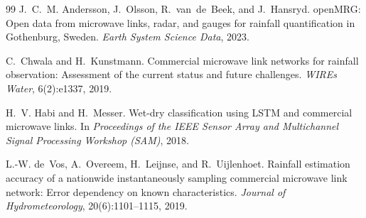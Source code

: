 \documentclass[12pt, a4paper]{article}
\begin{document}
\begin{thebibliography}{99}
J.~C.~M. Andersson, J.~Olsson, R.~van~de~Beek, and J.~Hansryd.
\newblock openMRG: Open data from microwave links, radar, and gauges for rainfall quantification in Gothenburg, Sweden.
\newblock \emph{Earth System Science Data}, 2023.

C.~Chwala and H.~Kunstmann.
\newblock Commercial microwave link networks for rainfall observation: Assessment of the current status and future challenges.
\newblock \emph{WIREs Water}, 6(2):e1337, 2019.

H.~V. Habi and H.~Messer.
\newblock Wet-dry classification using LSTM and commercial microwave links.
\newblock In \emph{Proceedings of the IEEE Sensor Array and Multichannel Signal Processing Workshop (SAM)}, 2018.

L.-W. de~Vos, A.~Overeem, H.~Leijnse, and R.~Uijlenhoet.
\newblock Rainfall estimation accuracy of a nationwide instantaneously sampling commercial microwave link network: Error dependency on known characteristics.
\newblock \emph{Journal of Hydrometeorology}, 20(6):1101--1115, 2019.

\end{thebibliography}
\end{document}
